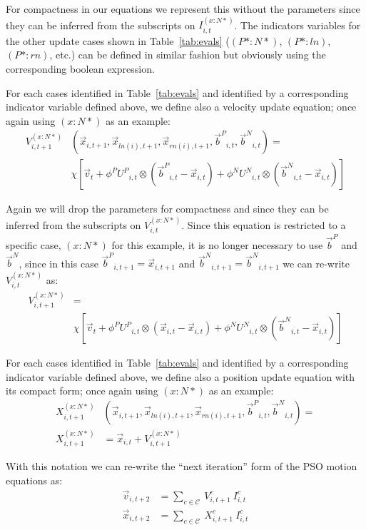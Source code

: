 \documentclass[journal,letterpaper]{IEEEtran}
\providecommand{\pers}{\ensuremath{P}}
\providecommand{\neigh}{\ensuremath{N}}
\providecommand{\nURand}{\ensuremath{U^\neigh}}
\providecommand{\pURand}{\ensuremath{U^\pers}}
\providecommand{\ppos}{\ensuremath{\Vec{x}}}
\providecommand{\pvel}{\ensuremath{\Vec{v}}}
\providecommand{\nbest}{\ensuremath{\Vec{b}^\neigh}}
\providecommand{\pbest}{\ensuremath{\Vec{b}^\pers}}
\providecommand{\constriction}{\ensuremath{\chi}}
\providecommand{\ncoeff}{\ensuremath{\phi^\neigh}}
\providecommand{\pcoeff}{\ensuremath{\phi^\pers}}
\providecommand{\indic}{\ensuremath{I}}
\providecommand{\specvel}{\ensuremath{V}}
\providecommand{\specpos}{\ensuremath{X}}
\providecommand{\ln}{\ensuremath{ln}}
\providecommand{\rn}{\ensuremath{rn}}
\providecommand{\caseset}{\ensuremath{\mathcal{C}}}
\providecommand{\casexn}{\ensuremath{(x:\neigh*)}}
\providecommand{\casepn}{\ensuremath{(\pers*:\neigh*)}}
\providecommand{\casepl}{\ensuremath{(\pers*:\ln)}}
\providecommand{\casepr}{\ensuremath{(\pers*:\rn)}}
\begin{document}
For compactness in our equations we represent this without the parameters since
they can be inferred from the subscripts on $\indic_{i,t}^{\casexn}$.  The
indicators variables for the other update cases shown in Table~\ref{tab:evals}
($\casepn$, $\casepl$, $\casepr$, etc.) can be defined in similar fashion but
obviously using the corresponding boolean expression.

For each cases identified in Table~\ref{tab:evals} and identified by a
corresponding indicator variable defined above, we define also a velocity
update equation; once again using $\casexn$ as an example:
\begin{align}
\nonumber
	\specvel_{i,t+1}^{\casexn} & (\ppos_{i,t+1} ,\ppos_{\ln(i),t+1},\ppos_{\rn(i),t+1} ,\pbest_{i,t} ,\nbest_{i,t})= \\
\label{eq:defvocasexn}
		& \constriction \left[ \pvel_t +
			\pcoeff\pURand_{i,t}\otimes(\pbest_{i,t} - \ppos_{i,t}) +
			\ncoeff\nURand_{i,t}\otimes(\nbest_{i,t} - \ppos_{i,t})
		\right]
\end{align}

Again we will drop the parameters for compactness and since
they can be inferred from the subscripts on $\specvel_{i,t}^{\casexn}$.
Since this equation is restricted to a specific case, $\casexn$ for this example,
it is no longer necessary to use $\pbest$ and $\nbest$, since in this case
$\pbest_{i,t+1}=\ppos_{i,t+1}$ and $\nbest_{i,t+1}=\nbest_{i,t+1}$ we can re-write
$\specvel_{i,t}^{\casexn}$ as:
\begin{align}
\nonumber
	\specvel_{i,t+1}^{\casexn} & = \\
\label{eq:defvcasexn}
		& \constriction \left[ \pvel_t +
			\pcoeff\pURand_{i,t}\otimes(\ppos_{i,t} - \ppos_{i,t}) +
			\ncoeff\nURand_{i,t}\otimes(\nbest_{i,t} - \ppos_{i,t})
		\right]
\end{align}

For each cases identified in
Table~\ref{tab:evals}
and identified by a corresponding indicator variable defined above,
we define also a position update equation with its compact form; once again using $\casexn$ as an example:
\begin{align}
\label{eq:defpcasexn}
	\specpos_{i,t+1}^{\casexn} & (\ppos_{i,t+1} ,\ppos_{\ln(i),t+1},\ppos_{\rn(i),t+1} ,\pbest_{i,t} ,\nbest_{i,t})= \\
\nonumber
	\specpos_{i,t+1}^{\casexn} & =  \ppos_{i,t} + \specvel_{i,t+1}^{\casexn}
\end{align}

With this notation we can re-write the ``next iteration'' form of the PSO motion equations as:
\begin{align}
\label{eq:vel2update}
	\pvel_{i,t+2} &= \sum_{c \in \caseset} \ \specvel_{i,t+1}^{c} \ \indic_{i,t}^{c} \\
\label{eq:pos2update}
	\ppos_{i,t+2} &= \sum_{c \in \caseset} \ \specpos_{i,t+1}^{c} \ \indic_{i,t}^{c}
\end{align}
\end{document}
